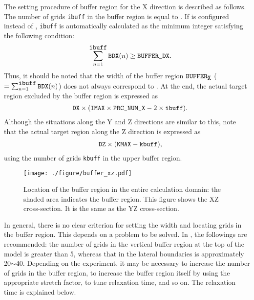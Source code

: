 The setting procedure of buffer region for the X direction is described as follows.
The number of grids \verb|ibuff| in the buffer region is equal to .
If  is configured instead of , \verb|ibuff| is automatically calculated as the minimum integer satisfying the following condition:
%
\begin{eqnarray}
   && \sum_{n=1}^{\verb|ibuff|} \verb|BDX|(n) \ge \nmitemeq{BUFFER_DX}. \nonumber
\end{eqnarray}
%
Thus, it should be noted that the width of the buffer region $\verb|BUFFER|_{\verb|X|}$ ($= \sum_{n=1}^{\verb|ibuff|} \verb|BDX|(n)$) does not always correspond to . At the end, the actual target region excluded by the buffer region is expressed as
%
\begin{eqnarray}
   && \nmitemeq{DX} \times ( \nmitemeq{IMAX} \times \nmitemeq{PRC_NUM_X} - 2 \times \verb|ibuff| ).
\end{eqnarray}
%
Although the situations along the Y and Z directions are similar to this, note that the actual target region along the Z direction is expressed as
%
\begin{eqnarray}
   && \nmitemeq{DZ} \times ( \nmitemeq{KMAX} - \verb|kbuff| ),
\end{eqnarray}
%
using the number of grids \verb|kbuff| in the upper buffer region.

\begin{figure}[t]
\begin{center}
  \texttt{[image: ./figure/buffer\_xz.pdf]}\\
  \caption{Location of the buffer region in the entire calculation domain: the shaded area indicates the buffer region. This figure shows the XZ cross-section. It is the same as the YZ cross-section.}
  \label{fig:buff_xz}
\end{center}
\end{figure}

In general, there is no clear criterion for setting the width and locating grids in the buffer region.
This depends on a problem to be solved.
In \scalerm, the followings are recommended: the number of grids in the vertical buffer region at the top of the model is greater than 5, whereas that in the lateral boundaries is approximately 20$\sim$40.
Depending on the experiment, it may be necessary to increase the number of grids in the buffer region, to increase the buffer region itself by using the appropriate stretch factor, to tune relaxation time, and so on.
The relaxation time is explained below.




